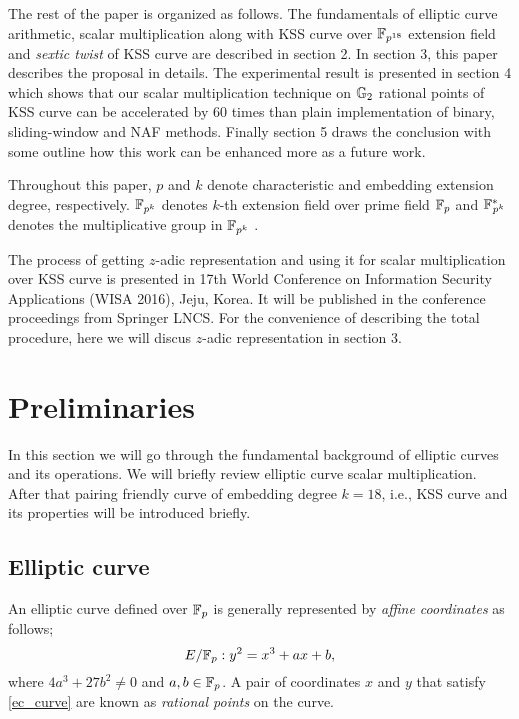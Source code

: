 The rest of the paper is organized as follows. 
The fundamentals of elliptic curve arithmetic, scalar multiplication along with KSS curve over $\mathbb{F}_{p^{18}}$ extension field and \textit{sextic twist} of KSS curve are described in section 2.
In section 3, this paper describes the proposal in details. The experimental result is presented in section 4 which shows that our scalar multiplication technique on ${\mathbb{G}}_{2}$ rational points of KSS curve can be accelerated by 60 times than plain implementation of binary, sliding-window and NAF methods. Finally section 5 draws the conclusion with some outline how this work can be enhanced more as a future work.

Throughout this paper, $p$ and $k$ denote characteristic and embedding extension degree, respectively. $\mathbb{F}_{p^k}$ denotes $k$-th extension field over prime field ${\mathbb{F}}_{p}$ and ${{\mathbb{F}}^{\ast}}_{\!\!\!p^{k}}$ denotes the multiplicative group in $\mathbb{F}_{p^k}$ .

The process of getting $z$-adic representation and using it for scalar multiplication over KSS curve is presented in 17th World Conference on Information Security Applications (WISA 2016), Jeju, Korea. It will be published in the conference proceedings from Springer LNCS.  For the convenience of describing the total procedure, here we will discus $z$-adic representation in section 3.

\section{Preliminaries}
In this section we will go through the fundamental background of elliptic curves and its operations. We will briefly review elliptic curve scalar multiplication. After that pairing friendly curve of embedding degree $k=18$, i.e., KSS curve and its properties will be introduced briefly.
\subsection{Elliptic curve}
An elliptic curve \cite{ecc_book} defined over ${\mathbb{F}}_{p}$ is generally represented by \textit{affine coordinates} \cite{Silverman} as follows;
\begin{equation}\label{ec_curve}
E/{\mathbb{F}}_{p} : y^2=x^3+ax+b,
\end{equation}
where $ 4a^3+27b^2 \neq 0$ and $a,b \in {\mathbb{F}}_{p}$. A pair of coordinates $x$ and $y$ that satisfy \eqref{ec_curve} are known as \textit{rational points} on the curve. 

